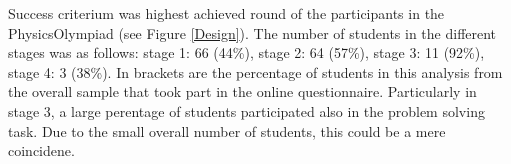\documentclass[C:/Users/Peter/Desktop/winners/IPhO1718/paper/probsol_paper/main/TaylorFrancis/interactapasample]{subfiles}
\begin{document}
Success criterium was highest achieved round of the participants in the PhysicsOlympiad (see Figure \ref{Design}). The number of students in the different stages was as follows: stage 1: 66 (44\%), stage 2: 64 (57\%), stage 3: 11 (92\%), stage 4: 3 (38\%). In brackets are the percentage of students in this analysis from the overall sample that took part in the online questionnaire. Particularly in stage 3, a large perentage of students participated also in the problem solving task. Due to the small overall number of students, this could be a mere coincidene.
\end{document}

